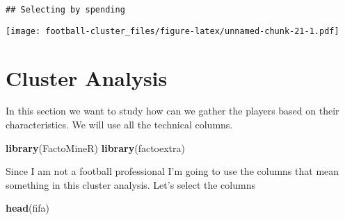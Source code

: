 \documentclass[]{article}
\newenvironment{Shaded}{\begin{snugshade}}{\end{snugshade}}
\newcommand{\KeywordTok}[1]{\textcolor[rgb]{0.13,0.29,0.53}{\textbf{#1}}}
\newcommand{\NormalTok}[1]{#1}
\begin{document}
\begin{verbatim}
## Selecting by spending
\end{verbatim}

\texttt{[image: football-cluster\_files/figure-latex/unnamed-chunk-21-1.pdf]}

\hypertarget{cluster-analysis}{%
\section{Cluster Analysis}\label{cluster-analysis}}

In this section we want to study how can we gather the players based on
their characteristics. We will use all the technical columns.

\begin{Shaded}
\begin{Highlighting}[]
\KeywordTok{library}\NormalTok{(FactoMineR)}
\KeywordTok{library}\NormalTok{(factoextra)}
\end{Highlighting}
\end{Shaded}

Since I am not a football professional I'm going to use the columns that
mean something in this cluster analysis. Let's select the columns

\begin{Shaded}
\begin{Highlighting}[]
\KeywordTok{head}\NormalTok{(fifa)}
\end{Highlighting}
\end{Shaded}
\end{document}
